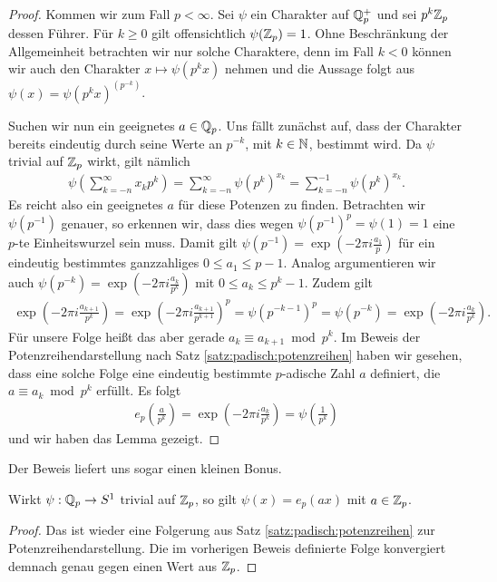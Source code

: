 \begin{proof}
			Kommen wir zum Fall $p<\infty$. 
			Sei $\psi$ ein Charakter auf $\mathbb{Q}_p^+$ und sei $p^k{\mathbb{Z}_p}$ dessen Führer.
			Für $k\geq 0$ gilt offensichtlich $\psi({\mathbb{Z}_p})=1$.
			Ohne Beschränkung der Allgemeinheit betrachten wir nur solche Charaktere, denn im Fall $k<0$ können wir auch den Charakter $x\mapsto \psi(p^kx)$ nehmen und die Aussage folgt aus $\psi(x) = \psi(p^kx)^{(p^{-k})}$.
			
			Suchen wir nun ein geeignetes $a\in{\mathbb{Q}_p}$. 
			Uns fällt zunächst auf, dass der Charakter bereits eindeutig durch seine Werte an $p^{-k}$, mit $k \in \mathbb{N}$, bestimmt wird.
			Da $\psi$ trivial auf ${\mathbb{Z}_p}$ wirkt, gilt nämlich
			\begin{align*}
				\psi \left( \sum_{k=-n}^\infty x_k p^k \right) = \sum_{k=-n}^{\infty} \psi \left(p^k \right)^{x_k} = \sum_{k=-n}^{-1} \psi \left(p^k \right)^{x_k}.
			\end{align*}
			Es reicht also ein geeignetes $a$ für diese Potenzen zu finden.
			Betrachten wir $\psi(p^{-1})$ genauer, so erkennen wir, dass dies wegen $\psi(p^{-1})^p = \psi(1) = 1$ eine $p$-te Einheitswurzel sein muss.
			Damit gilt $\psi(p^{-1}) = \exp(-2\pi i \frac{a_1}{p})$ für ein eindeutig bestimmtes ganzzahliges $0\leq a_1 \leq p - 1$.
			Analog argumentieren wir auch $\psi(p^{-k}) = \exp(-2\pi i \frac{a_k}{p^k})$ mit $0\leq a_k \leq p^k - 1$.
			Zudem gilt 
			\begin{align*}
				\exp\left(-2\pi i \frac{a_{k+1}}{p^{k}}\right) = \exp\left(-2\pi i \frac{a_{k+1}}{p^{k+1}}\right)^{p}= \psi(p^{-k-1})^p = \psi(p^{-k}) = \exp\left(-2\pi i \frac{a_k}{p^k}\right).
			\end{align*}
			Für unsere Folge heißt das aber gerade $a_k \equiv a_{k+1} \bmod{p^k}$.
			Im Beweis der Potenzreihendarstellung nach Satz \ref{satz:padisch:potenzreihen} haben wir gesehen, dass eine solche Folge eine eindeutig bestimmte $p$-adische Zahl $a$ definiert, die $a \equiv a_k \bmod{p^k}$ erfüllt.
			Es folgt
			\begin{align*}
				e_p\left( \frac{a}{p^{k}} \right) = \exp\left(- 2\pi i \frac{a_k}{p^k} \right) = \psi \left( \frac{1}{p^k} \right)
			\end{align*}
			und wir haben das Lemma gezeigt.
		\end{proof}
		Der Beweis liefert uns sogar einen kleinen Bonus.
		\begin{korollar}\label{kor:lokal:charTrivialZp}
			Wirkt $\psi:{\mathbb{Q}_p}\to S^1$ trivial auf ${\mathbb{Z}_p}$, so gilt $\psi(x) = e_p(ax)$ mit $a\in {\mathbb{Z}_p}$.
		\end{korollar}
		\begin{proof}
			Das ist wieder eine Folgerung aus Satz \ref{satz:padisch:potenzreihen} zur Potenzreihendarstellung.
			Die im vorherigen Beweis definierte Folge konvergiert demnach genau gegen einen Wert aus ${\mathbb{Z}_p}$.
		\end{proof}
		
